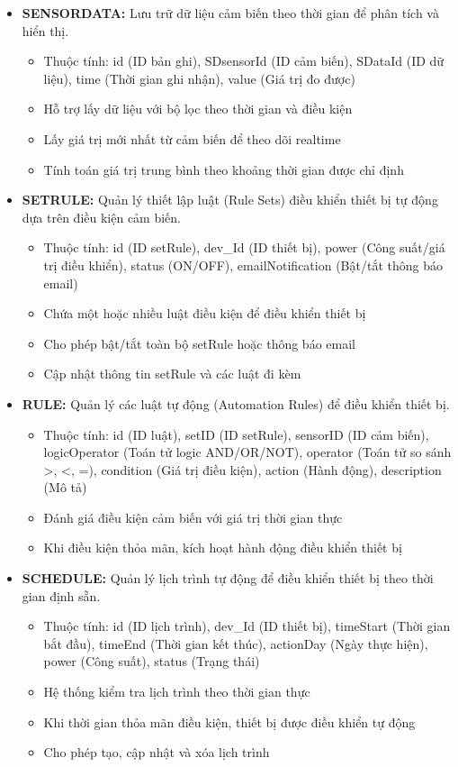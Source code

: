 \documentclass[12pt,a4paper]{article}
\begin{document}
\begin{itemize}
    \item \textbf{SENSORDATA: } Lưu trữ dữ liệu cảm biến theo thời gian để phân tích và hiển thị.
    \begin{itemize}
        \item Thuộc tính: id (ID bản ghi), SDsensorId (ID cảm biến), SDataId (ID dữ liệu), time (Thời gian ghi nhận), value (Giá trị đo được)
        \item Hỗ trợ lấy dữ liệu với bộ lọc theo thời gian và điều kiện
        \item Lấy giá trị mới nhất từ cảm biến để theo dõi realtime
        \item Tính toán giá trị trung bình theo khoảng thời gian được chỉ định
    \end{itemize}

    \item \textbf{SETRULE: } Quản lý thiết lập luật (Rule Sets) điều khiển thiết bị tự động dựa trên điều kiện cảm biến.
    \begin{itemize}
        \item Thuộc tính: id (ID setRule), dev\_Id (ID thiết bị), power (Công suất/giá trị điều khiển), status (ON/OFF), emailNotification (Bật/tắt thông báo email)
        \item Chứa một hoặc nhiều luật điều kiện để điều khiển thiết bị
        \item Cho phép bật/tắt toàn bộ setRule hoặc thông báo email
        \item Cập nhật thông tin setRule và các luật đi kèm
    \end{itemize}

    \item \textbf{RULE: } Quản lý các luật tự động (Automation Rules) để điều khiển thiết bị.
    \begin{itemize}
        \item Thuộc tính: id (ID luật), setID (ID setRule), sensorID (ID cảm biến), logicOperator (Toán tử logic AND/OR/NOT), operator (Toán tử so sánh >, <, =), condition (Giá trị điều kiện), action (Hành động), description (Mô tả)
        \item Đánh giá điều kiện cảm biến với giá trị thời gian thực
        \item Khi điều kiện thỏa mãn, kích hoạt hành động điều khiển thiết bị
    \end{itemize}

    \item \textbf{SCHEDULE: } Quản lý lịch trình tự động để điều khiển thiết bị theo thời gian định sẵn.
    \begin{itemize}
        \item Thuộc tính: id (ID lịch trình), dev\_Id (ID thiết bị), timeStart (Thời gian bắt đầu), timeEnd (Thời gian kết thúc), actionDay (Ngày thực hiện), power (Công suất), status (Trạng thái)
        \item Hệ thống kiểm tra lịch trình theo thời gian thực
        \item Khi thời gian thỏa mãn điều kiện, thiết bị được điều khiển tự động
        \item Cho phép tạo, cập nhật và xóa lịch trình
    \end{itemize}


\end{itemize}
\end{document}
